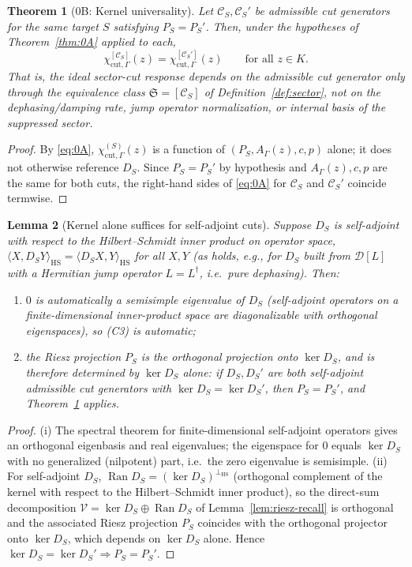 \documentclass[11pt]{article}
\newtheorem{theorem}{Theorem}[section]
\newtheorem{lemma}[theorem]{Lemma}
\newcommand{\Ran}{\operatorname{Ran}}
\renewcommand{\S}{\mathfrak S}
\begin{document}
\begin{theorem}[0B: Kernel universality]
\label{thm:0B}
Let $\mathcal C_S,\mathcal C_S'$ be admissible cut generators for the same
target $S$ satisfying $P_S=P_S'$. Then, under the hypotheses of
Theorem~\ref{thm:0A} applied to each,
\[
\chi_{\mathrm{cut},\Gamma}^{[\mathcal C_S]}(z)
=\chi_{\mathrm{cut},\Gamma}^{[\mathcal C_S']}(z)
\qquad\text{for all }z\in K.
\]
That is, the ideal sector-cut response depends on the admissible cut
generator only through the equivalence class $\S=[\mathcal C_S]$ of
Definition~\ref{def:sector}, not on the dephasing/damping rate, jump
operator normalization, or internal basis of the suppressed sector.
\end{theorem}

\begin{proof}
By \eqref{eq:0A}, $\chi_{\mathrm{cut},\Gamma}^{(S)}(z)$ is a function of
$(P_S,A_\Gamma(z),c,p)$ alone; it does not otherwise reference $D_S$.
Since $P_S=P_S'$ by hypothesis and $A_\Gamma(z),c,p$ are the same for both
cuts, the right-hand sides of \eqref{eq:0A} for $\mathcal C_S$ and
$\mathcal C_S'$ coincide termwise.
\end{proof}

\begin{lemma}[Kernel alone suffices for self-adjoint cuts]
\label{lem:kernel-suffices}
Suppose $D_S$ is self-adjoint with respect to the Hilbert--Schmidt inner
product on operator space, $\langle X,D_SY\rangle_{\mathrm{HS}}
=\langle D_SX,Y\rangle_{\mathrm{HS}}$ for all $X,Y$ (as holds, e.g., for
$D_S$ built from $\mathcal D[L]$ with a Hermitian jump operator $L=L^\dagger$,
i.e.\ pure dephasing). Then:
\begin{enumerate}[label=(\roman*),nosep]
\item $0$ is automatically a semisimple eigenvalue of $D_S$ (self-adjoint
      operators on a finite-dimensional inner-product space are
      diagonalizable with orthogonal eigenspaces), so (C3) is automatic;
\item the Riesz projection $P_S$ is the \emph{orthogonal} projection onto
      $\ker D_S$, and is therefore determined by $\ker D_S$ alone: if
      $D_S,D_S'$ are both self-adjoint admissible cut generators with
      $\ker D_S=\ker D_S'$, then $P_S=P_S'$, and Theorem~\ref{thm:0B}
      applies.
\end{enumerate}
\end{lemma}

\begin{proof}
(i) The spectral theorem for finite-dimensional self-adjoint operators
gives an orthogonal eigenbasis and real eigenvalues; the eigenspace for
$0$ equals $\ker D_S$ with no generalized (nilpotent) part, i.e.\ the zero
eigenvalue is semisimple.
(ii) For self-adjoint $D_S$, $\Ran D_S=(\ker D_S)^{\perp_{\mathrm{HS}}}$
(orthogonal complement of the kernel with respect to the Hilbert--Schmidt
inner product), so the direct-sum decomposition
$\mathcal V=\ker D_S\oplus\Ran D_S$ of
Lemma~\ref{lem:riesz-recall} is orthogonal and the associated Riesz
projection $P_S$ coincides with the orthogonal projector onto
$\ker D_S$, which depends on $\ker D_S$ alone. Hence
$\ker D_S=\ker D_S'\Rightarrow P_S=P_S'$.
\end{proof}
\end{document}
